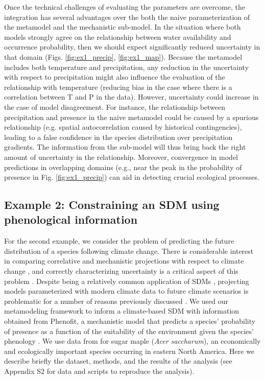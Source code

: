 \documentclass[11pt]{article}
\begin{document}
Once the technical challenges of evaluating the parameters are overcome, the integration has several advantages over the both the naive parameterization of the metamodel and the mechanistic sub-model. 
In the situation where both models strongly agree on the relationship between water availability and occurrence probability, then we should expect significantly reduced uncertainty in that domain (Figs. \ref{fig:ex1_precip}, \ref{fig:ex1_map}).
Because the metamodel includes both temperature and precipitation, any reduction in the uncertainty with respect to precipitation might also influence the evaluation of the relationship with temperature (reducing bias in the case where there is a correlation between T and P in the data). 
However, uncertainty could increase in the case of model disagreement.
For instance, the relationship between precipitation and presence in the naive metamodel could be caused by a spurious relationship (e.g. spatial autocorrelation caused by historical contingencies), leading to a false confidence in the species distribution over precipitation gradients. 
The information from the sub-model will thus bring back the right amount of uncertainty in the relationship.
Moreover, convergence in model predictions in overlapping domains (e.g., near the peak in the probability of presence in Fig. \ref{fig:ex1_precip}) can aid in detecting crucial ecological processes.



%
%


\subsection*{Example 2: Constraining an SDM using phenological information}
For the second example, we consider the problem of predicting the future distribution of a species following climate change.
There is considerable interest in comparing correlative and mechanistic projections with respect to climate change \citep{Morin2009}, and correctly characterizing uncertainty is a critical aspect of this problem \citep{Cheaib2012}.
Despite being a relatively common application of \ac{SDM}s \citep{Guisan2005}, projecting models parameterized with modern climate data to future climate scenarios is problematic for a number of reasons previously discussed \citep{Araujo2006}.
We used our metamodeling framework to inform a climate-based SDM with information obtained from Phenofit, a mechanistic model that predicts a species' probability of presence as a function of the suitability of the environment given the species' phenology \citep{Chuine2001, Morin2009}.
We use data from \citet{Morin2009} for sugar maple (\emph{Acer saccharum}), an economically and ecologically important species occurring in eastern North America.
Here we describe briefly the dataset, methods, and the results of the analysis (see Appendix S2 for data and scripts to reproduce the analysis).
\end{document}
